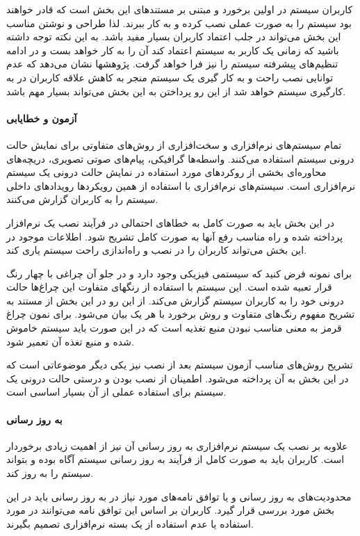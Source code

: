    کاربران سیستم در اولین برخورد و مبتنی بر مستندهای این بخش است که قادر خواهند بود
   سیستم را به صورت عملی نصب کرده و به کار ببرند. لذا طراحی و نوشتن مناسب این بخش
   می‌تواند در جلب اعتماد کاربران بسیار مفید باشد. به این نکته توجه داشته باشید
   که زمانی یک کاربر به سیستم اعتماد کند آن را به کار خواهد بست و در ادامه
   تنظیم‌های پیشرفته سیستم را نیز فرا خواهد گرفت. پژوهشها نشان می‌دهد که عدم
   توانایی نصب راحت و به کار گیری یک سیستم منجر به کاهش علاقه کاربران در به
   کارگیری سیستم خواهد شد از این رو پرداختن به این بخش می‌تواند بسیار مهم باشد.

\paragraph{آزمون و خطایابی}
    تمام سیستم‌های نرم‌افزاری و سخت‌افزاری از روش‌های متفاوتی برای نمایش حالت
    درونی سیستم استفاده می‌کنند.
    واسطه‌ها گرافیکی، پیام‌های صوتی تصویری، دریچه‌های محاوره‌ای بخشی از روکردهای
    مورد استفاده در نمایش حالت درونی یک سیستم نرم‌افزاری است. سیستم‌های
    نرم‌افزاری با استفاده از همین رویکردها رویدادهای داخلی سیستم را به
    کاربران گزارش می‌کنند.

    در این بخش باید به صورت کامل به خطاهای احتمالی در فرآیند نصب یک نرم‌افزار
    پرداخته شده و راه مناسب رفع آنها به صورت کامل تشریح شود. اطلاعات موجود در
    این بخش می‌تواند کاربران را در نصب و راه‌اندازی راحت سیستم یاری کند.

    برای نمونه فرض کنید که سیستمی فیزیکی وجود دارد و در جلو آن چراغی با چهار
    رنگ قرار تعبیه شده است.
    این سیستم با استفاده از رنگهای متفاوت این چراغ‌ها حالت درونی خود را به کاربران
    سیستم گزارش می‌کند.
    از این رو در این بخش از مستند به تشریح مفهوم رنگ‌های متفاوت و روش برخورد با هر 
یک بیان می‌شود. برای نمون چراغ قرمز به معنی مناسب نبودن
    منبع تغذیه است که در این صورت باید سیستم خاموش شده و منبع تغذه آن تعمیر شود.

    تشریح روش‌های مناسب آزمون سیستم بعد از نصب نیز یکی دیگر موضوعاتی است که در
    این بخش به آن پرداخته می‌شود. اطمینان از نصب بودن و درستی حالت درونی یک
    سیستم برای استفاده عملی از آن بسیار اساسی است.

\paragraph{به روز رسانی}
    علاوبه بر نصب یک سیستم نرم‌افزاری به روز رسانی آن نیز از اهمیت زیادی
    برخوردار است. کاربران باید به صورت کامل از فرآیند به روز رسانی سیستم آگاه
    بوده و بتواند سیستم را به روز کند.

    محدودیت‌های به روز رسانی و یا توافق نامه‌های مورد نیاز در به روز رسانی
    باید در این بخش مورد بررسی قرار گیرد. کاربران بر اساس این توافق نامه
    می‌توانند در مورد استفاده یا عدم استفاده از یک بسته نرم‌افزاری تصمیم بگیرند.
    
